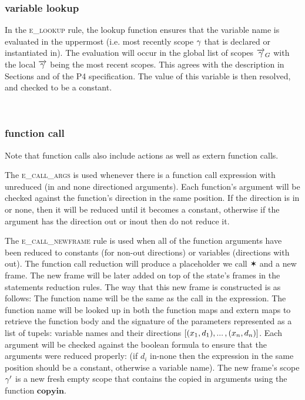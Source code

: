 \documentclass[UTF8]{article}
\begin{document}
\subsubsection*{variable lookup}
In the \textsc{e\_lookup} rule, the lookup function ensures that the variable name \vn{} is evaluated in the uppermost (i.e. most recently scope $\gamma$ that \vn{} is declared or instantiated in). The evaluation will occur in the global list of scopes $\overrightarrow{\gamma}_G$ with the local $\overrightarrow{\gamma}{}$ being the most recent scopes. This agrees with the description in Sections  and  of the P4 specification. The value of this variable is then resolved, and checked to be a constant.

\begin{figure}[ht!]
    \ottusedrule{\ottdruleeXXlookup{}} \\
\end{figure}



\subsubsection*{function call}
Note that function calls also include actions as well as extern function calls.

The \textsc{e\_call\_args} is used whenever there is a function call expression with unreduced (in and none directioned arguments). Each function's argument will be checked against the function's direction in the same position. If the direction is in or none, then it will be reduced until it becomes a constant, otherwise if the argument has the direction out or inout then do not reduce it.

The \textsc{e\_call\_newframe} rule is used when all of the function arguments have been reduced to constants (for non-out directions) or variables (directions with out). The function call reduction will produce a placeholder we call $\varstar$ and a new frame. The new frame will be later added on top of the state's frames in the statements reduction rules. 
The way that this new frame is constructed is as follows: The function name \funn{} will be the same as the call in the expression. The function name \funn{} will be looked up in both the function maps and extern maps to retrieve the function body \stmt{}  and the signature of the parameters represented as a list of tupels: variable names and their directions $ [(x{}_1, d_1) , ... \, , (x{}_n, d_n) ] $. Each argument will be checked against the boolean formula to ensure that the arguments were reduced properly: (if $d_i$ in-none then the expression in the same position should be a constant, otherwise a variable name). The new frame's scope $\gamma'$ is a new fresh empty scope that contains the copied in arguments using the function $\mathbf{copyin}$.
\end{document}
